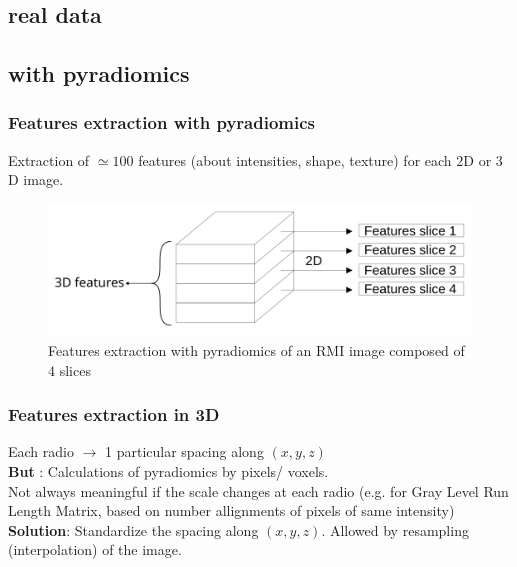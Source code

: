 \documentclass{beamer}
\begin{document}
\begin{frame}
    \section{real data}
    \subsection{with pyradiomics}
\end{frame}

\begin{frame}
    \frametitle{Features extraction with pyradiomics \cite{pyradio}}
    Extraction of $\simeq  100$ features (about intensities, shape, texture) for each $2$D or $3$D image.\\[10 pt]
    \begin{figure}
        \centering
        \includegraphics[scale = 0.15]{images/features.png}
        \caption{Features extraction with pyradiomics of an RMI image composed of $4$ slices}
    \end{figure}
\end{frame}

\begin{frame}
    \frametitle{Features extraction in 3D}
    Each radio $\rightarrow$ 1 particular spacing along $(x,y,z)$\\[10 pt]
    \textbf{But} : Calculations of pyradiomics by pixels/ voxels.\\[10 pt]
    Not always meaningful if the scale changes at each radio (e.g. for Gray Level Run Length Matrix, based on number allignments of pixels of same intensity)\\[10 pt]
    \textbf{Solution}: Standardize the spacing along $(x,y,z)$. Allowed by resampling (interpolation) of the image.
\end{frame}
\end{document}

